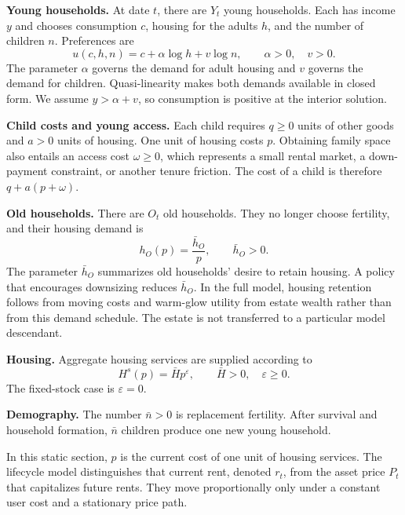 \documentclass[11pt]{article}
\theoremstyle{definition}
\newcommand{\1}{\mathbf 1}
\begin{document}
\textbf{Young households.} At date $t$, there are $Y_t$ young households. Each
has income $y$ and chooses consumption $c$, housing for the adults $h$, and the
number of children $n$. Preferences are
\begin{equation}
 u(c,h,n)=c+\alpha\log h+v\log n,
 \qquad \alpha>0,\quad v>0.
 \label{eq:toy_utility}
\end{equation}
The parameter $\alpha$ governs the demand for adult housing and $v$
governs the demand for children. Quasi-linearity makes both demands available
in closed form. We assume $y>\alpha+v$, so consumption is positive at the
interior solution.

\textbf{Child costs and young access.} Each child requires $q\geq0$ units of
other goods and $a>0$ units of housing. One unit of housing costs $p$. Obtaining
family space also entails an access cost $\omega\geq0$, which represents a
small rental market, a down-payment constraint, or another tenure friction.
The cost of a child is therefore $q+a(p+\omega)$.

\textbf{Old households.} There are $O_t$ old households. They no longer choose
fertility, and their housing demand is
\begin{equation}
 h_O(p)=\frac{\bar h_O}{p},
 \qquad \bar h_O>0.
 \label{eq:old_demand}
\end{equation}
The parameter $\bar h_O$ summarizes old households' desire to retain housing.
A policy that encourages downsizing reduces $\bar h_O$. In the full model,
housing retention follows from moving costs and warm-glow utility from estate
wealth rather than from this demand schedule. The estate is not transferred to
a particular model descendant.

\textbf{Housing.} Aggregate housing services are supplied according to
\begin{equation}
 H^s(p)=\bar H p^\varepsilon,
 \qquad \bar H>0,\quad \varepsilon\geq0.
 \label{eq:toy_supply}
\end{equation}
The fixed-stock case is $\varepsilon=0$.

\textbf{Demography.} The number $\bar n>0$ is replacement fertility. After
survival and household formation, $\bar n$ children produce one new young
household.

In this static section, $p$ is the current cost of one unit of housing
services. The lifecycle model distinguishes that current rent, denoted $r_t$,
from the asset price $P_t$ that capitalizes future rents. They move
proportionally only under a constant user cost and a stationary price path.
\end{document}
